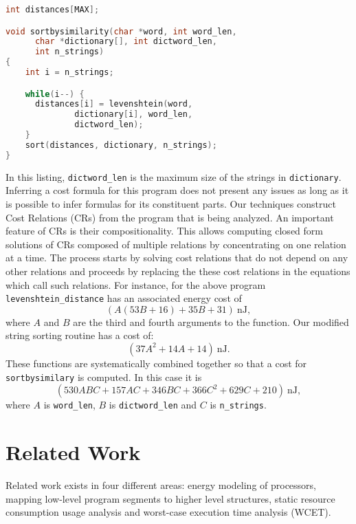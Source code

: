 \documentclass[9pt,preprint]{sigplanconf}
\begin{document}
\begin{lstlisting}[belowskip=-1pt, language=c,float,caption={Sort by similarity function,
    demonstrating that the analysis can be composed across multiple
    functions.},label=lst:composability_example]
int distances[MAX];

void sortbysimilarity(char *word, int word_len,
      char *dictionary[], int dictword_len,
      int n_strings)
{
    int i = n_strings;

    while(i--) {
      distances[i] = levenshtein(word,
              dictionary[i], word_len,
              dictword_len);
    }
    sort(distances, dictionary, n_strings);
}
\end{lstlisting}

In this listing, \texttt{dictword\_len} is the maximum size of the strings in
\texttt{dictionary}. Inferring a cost formula for this program does not present
any issues as long as it is possible to infer formulas for its constituent
parts. Our techniques construct Cost Relations (CRs) from the program that is being analyzed.
An important feature of CRs is their compositionality. This
allows computing closed form solutions of CRs composed of multiple relations by
concentrating on one relation at a time. The process starts by solving cost
relations that do not depend on any other relations and proceeds by replacing the
these cost relations in the equations which call such relations. For instance,
for the above program \texttt{levenshtein\_distance} has an associated energy
cost of
\begin{equation}
\left(A (53B+16)+35B+31\right)~\textrm{nJ},
\end{equation}
where $A$ and $B$ are the third and fourth arguments to the
function. Our modified string sorting routine has a cost of:
\begin{equation}
  \left(37 A^2+14 A+14\right)~\textrm{nJ}.
\end{equation}
These functions are systematically combined together so that a cost for
\texttt{sortbysimilary} is computed. In this case it is
\begin{equation}
\left(530 A B C+157 A C+346 BC+366 C^2+629 C+210\right)~\textrm{nJ},
\end{equation}
where $A$ is \texttt{word\_len}, $B$ is \texttt{dictword\_len} and $C$ is
\texttt{n\_strings}.

\section{Related Work}
Related work exists in four different areas: energy modeling of processors,
mapping low-level program segments to higher level structures, static resource consumption
usage analysis and worst-case execution time analysis (WCET).
\end{document}
